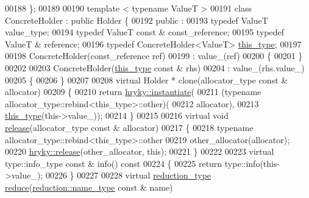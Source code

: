 \begin{DoxyCode}
00188     \};
00189 
00190     \textcolor{keyword}{template} < \textcolor{keyword}{typename} ValueT >
00191     \textcolor{keyword}{class }ConcreteHolder : \textcolor{keyword}{public} Holder \{
00192     \textcolor{keyword}{public} :
00193         \textcolor{keyword}{typedef} ValueT value\_type;
00194         \textcolor{keyword}{typedef} ValueT \textcolor{keyword}{const} & const\_reference;
00195         \textcolor{keyword}{typedef} ValueT & reference;
00196         \textcolor{keyword}{typedef} ConcreteHolder<ValueT> \hyperlink{classhryky_1_1_any_accb3d649460111ed6f04293f3e5865bc}{this_type};
00197         
00198         ConcreteHolder(const\_reference ref)
00199             : value\_(ref)
00200         \{
00201         \}
00202         
00203         ConcreteHolder(\hyperlink{classhryky_1_1_any_accb3d649460111ed6f04293f3e5865bc}{this_type} \textcolor{keyword}{const} & rhs)
00204             : value\_(rhs.value\_)
00205         \{
00206         \}
00207         
00208         \textcolor{keyword}{virtual} Holder * clone(allocator\_type \textcolor{keyword}{const} & allocator)
00209         \{
00210             \textcolor{keywordflow}{return} \hyperlink{namespacehryky_a7e731db6d90571cf1aea6e113d43b6ad}{hryky::instantiate}(
00211                 (\textcolor{keyword}{typename} allocator\_type::rebind<this\_type>::other)(
00212                     allocator),
00213                 \hyperlink{classhryky_1_1_any_accb3d649460111ed6f04293f3e5865bc}{this_type}(this->value\_));
00214         \}
00215         
00216         \textcolor{keyword}{virtual} \textcolor{keywordtype}{void} \hyperlink{namespacehryky_a9bdf380c3703ef316b807edae92a930a}{release}(allocator\_type \textcolor{keyword}{const} & allocator)
00217         \{
00218             \textcolor{keyword}{typename} allocator\_type::rebind<this\_type>::other
00219                 other\_allocator(allocator);
00220             \hyperlink{namespacehryky_a9bdf380c3703ef316b807edae92a930a}{hryky::release}(other\_allocator, \textcolor{keyword}{this});
00221         \}
00222 
00223         \textcolor{keyword}{virtual} type::info\_type \textcolor{keyword}{const} & info()\textcolor{keyword}{ const}
00224 \textcolor{keyword}{        }\{
00225             \textcolor{keywordflow}{return} type::info(this->value\_);
00226         \}
00227         
00228         \textcolor{keyword}{virtual} \hyperlink{namespacehryky_a343a9a4c36a586be5c2693156200eadc}{reduction_type} \hyperlink{classhryky_1_1_any_a53cbd925fa67505daab6e79749559517}{reduce}(\hyperlink{namespacehryky_1_1reduction_ac686c30a4c8d196bbd0f05629a6b921f}{reduction::name_type} \textcolor{keyword}{const} & name)

\end{DoxyCode}

